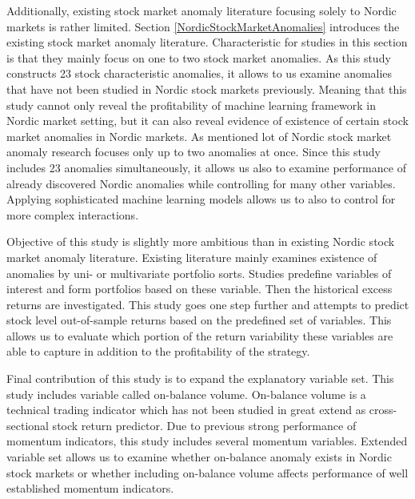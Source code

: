 \documentclass{article}
\begin{document}
Additionally, existing stock market anomaly literature focusing solely to Nordic markets is rather limited. Section \ref{NordicStockMarketAnomalies} introduces the existing stock market anomaly literature. Characteristic for studies in this section is that they mainly focus on one to two stock market anomalies. As this study constructs 23 stock characteristic anomalies, it allows to us examine anomalies that have not been studied in Nordic stock markets previously. Meaning that this study cannot only reveal the profitability of machine learning framework in Nordic market setting, but it can also reveal evidence of existence of certain stock market anomalies in Nordic markets. As mentioned lot of Nordic stock market anomaly research focuses only up to two anomalies at once. Since this study includes 23 anomalies simultaneously, it allows us also to examine performance of already discovered Nordic anomalies while controlling for many other variables. Applying sophisticated machine learning models allows us to also to control for more complex interactions. \par

Objective of this study is slightly more ambitious than in existing Nordic stock market anomaly literature. Existing literature mainly examines existence of anomalies by uni- or multivariate portfolio sorts. Studies predefine variables of interest and form portfolios based on these variable. Then the historical excess returns are investigated. This study goes one step further and attempts to predict stock level out-of-sample returns based on the predefined set of variables. This allows us to evaluate which portion of the return variability these variables are able to capture in addition to the profitability of the strategy. \par

Final contribution of this study is to expand the explanatory variable set. This study includes variable called on-balance volume. On-balance volume is a technical trading indicator which has not been studied in great extend as cross-sectional stock return predictor. Due to previous strong performance of momentum indicators, this study includes several momentum variables. Extended variable set allows us to examine whether on-balance anomaly exists in Nordic stock markets or whether including on-balance volume affects performance of well established momentum indicators. \par

\end{document}
